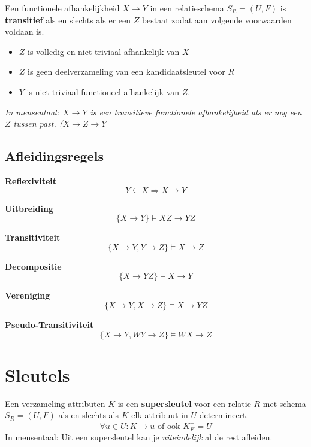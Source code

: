 \documentclass[normaalvormen.tex]{subfiles}
\begin{document}
\begin{de}
Een functionele afhankelijkheid $X\rightarrow Y$ in een relatieschema $S_{R} = (U,F)$ is \textbf{transitief} als en slechts als er een $Z$ bestaat zodat aan volgende voorwaarden voldaan is.
\begin{itemize}
\item $Z$ is volledig en niet-triviaal afhankelijk van $X$
\item $Z$ is geen deelverzameling van een kandidaatsleutel voor $R$
\item $Y$ is niet-triviaal functioneel afhankelijk van $Z$.
\end{itemize}
\emph{In mensentaal: $X\rightarrow Y$ is een transitieve functionele afhankelijheid als er nog een $Z$ tussen past. ($X\rightarrow Z\rightarrow Y$}
\end{de}

\subsection{Afleidingsregels}
\begin{reg} \textbf{Reflexiviteit}
\[
Y \subseteq X \Rightarrow X \rightarrow Y
\]
\end{reg}
\begin{reg} \textbf{Uitbreiding}
\[
\{X \rightarrow Y\} \models XZ \rightarrow YZ
\]
\end{reg}
\begin{reg} \textbf{Transitiviteit}
\[
\{X \rightarrow Y, Y \rightarrow Z\} \models X \rightarrow Z
\]
\end{reg} 
\begin{reg}\textbf{Decompositie}
\[
\{X \rightarrow YZ\} \models X \rightarrow Y
\]
\end{reg}
\begin{reg} \textbf{Vereniging}
\[
\{X\rightarrow Y, X\rightarrow Z \} \models X\rightarrow YZ
\]
\end{reg}
\begin{reg} \textbf{Pseudo-Transitiviteit}
\[
\{ X\rightarrow Y, WY \rightarrow Z \} \models WX\rightarrow Z
\]
\end{reg}

\section{Sleutels}
\begin{de}
Een verzameling attributen $K$ is een \textbf{supersleutel} voor een relatie $R$ met schema $S_{R} = (U,F)$ als en slechts als $K$ elk attribuut in $U$ determineert.
\[
\forall u \in U:  K\rightarrow u \text{ of ook } K_{F}^{+} = U
\]
In mensentaal:
Uit een supersleutel kan je \emph{uiteindelijk} al de rest afleiden.
\end{de}
\end{document}
